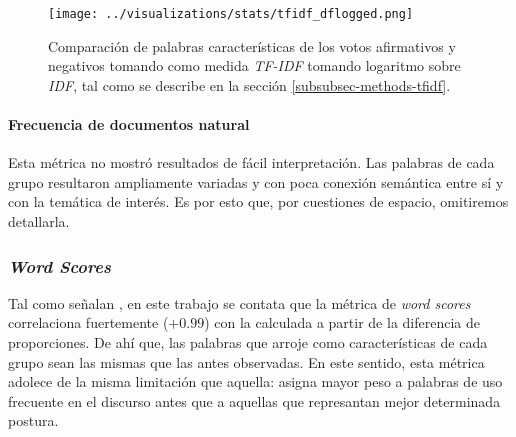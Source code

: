 \begin{figure}[h!]
    \centering
    \texttt{[image: ../visualizations/stats/tfidf\_dflogged.png]}
    \caption{Comparaci\'on de palabras caracter\'isticas de los votos afirmativos y
    negativos tomando como medida \textit{TF-IDF} tomando logaritmo
    sobre \textit{IDF}, tal como se describe en la secci\'on
    \ref{subsubsec-methods-tfidf}.}
    \label{fig-statistics-wordscores}
\end{figure}


\paragraph{Frecuencia de documentos natural}
Esta m\'etrica no mostr\'o resultados de f\'acil interpretaci\'on. Las palabras de cada
grupo resultaron ampliamente variadas y con poca conexi\'on sem\'antica
entre s\'i y con la tem\'atica de inter\'es. Es por esto que, por cuestiones de espacio,
omitiremos detallarla.

\subsubsection{\textit{Word Scores}}

Tal como señalan \cite{monroe2008fightin}, en este trabajo se contata que
la m\'etrica de \textit{word scores} correlaciona fuertemente ($+0.99$) con
la calculada a partir de la diferencia de proporciones. De ah\'i que, las palabras
que arroje como caracter\'isticas de cada grupo sean las mismas que las antes
observadas. En este sentido, esta m\'etrica adolece de la misma limitaci\'on
que aquella: asigna mayor peso a palabras de uso frecuente en el discurso antes
que a aquellas que represantan mejor determinada postura.
